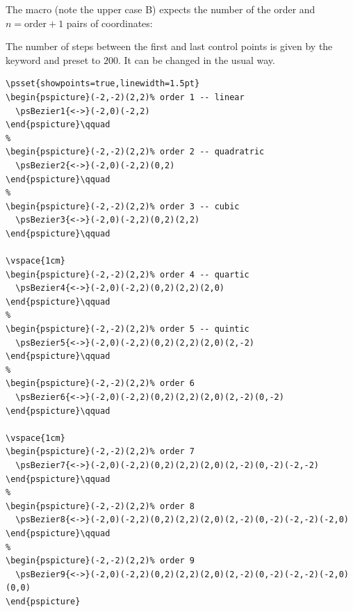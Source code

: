 \documentclass[fontsize=11pt,english,BCOR=10mm,DIV=12,bibliography=totoc,parskip=false,headings=small,
    headinclude=false,footinclude=false,oneside]{pst-doc}
\begin{document}
The macro  (note the upper case B) expects the number of the order 
and $n=\text{order}+1$ pairs of coordinates:

\begin{BDef}
\Larg{\#}\OptArgs{}\coordn
\end{BDef}


The number of steps between the first and last control points is given
by the keyword  and preset to $200$. It can be
changed in the usual way. 

\begin{lstlisting}
\psset{showpoints=true,linewidth=1.5pt}
\begin{pspicture}(-2,-2)(2,2)% order 1 -- linear
  \psBezier1{<->}(-2,0)(-2,2)
\end{pspicture}\qquad
%
\begin{pspicture}(-2,-2)(2,2)% order 2 -- quadratric
  \psBezier2{<->}(-2,0)(-2,2)(0,2)
\end{pspicture}\qquad
%
\begin{pspicture}(-2,-2)(2,2)% order 3 -- cubic
  \psBezier3{<->}(-2,0)(-2,2)(0,2)(2,2)
\end{pspicture}\qquad

\vspace{1cm}
\begin{pspicture}(-2,-2)(2,2)% order 4 -- quartic
  \psBezier4{<->}(-2,0)(-2,2)(0,2)(2,2)(2,0)
\end{pspicture}\qquad
%
\begin{pspicture}(-2,-2)(2,2)% order 5 -- quintic
  \psBezier5{<->}(-2,0)(-2,2)(0,2)(2,2)(2,0)(2,-2)
\end{pspicture}\qquad
%
\begin{pspicture}(-2,-2)(2,2)% order 6
  \psBezier6{<->}(-2,0)(-2,2)(0,2)(2,2)(2,0)(2,-2)(0,-2)
\end{pspicture}\qquad

\vspace{1cm}
\begin{pspicture}(-2,-2)(2,2)% order 7
  \psBezier7{<->}(-2,0)(-2,2)(0,2)(2,2)(2,0)(2,-2)(0,-2)(-2,-2)
\end{pspicture}\qquad
%
\begin{pspicture}(-2,-2)(2,2)% order 8
  \psBezier8{<->}(-2,0)(-2,2)(0,2)(2,2)(2,0)(2,-2)(0,-2)(-2,-2)(-2,0)
\end{pspicture}\qquad
%
\begin{pspicture}(-2,-2)(2,2)% order 9
  \psBezier9{<->}(-2,0)(-2,2)(0,2)(2,2)(2,0)(2,-2)(0,-2)(-2,-2)(-2,0)(0,0)
\end{pspicture}
\end{lstlisting}
\end{document}
